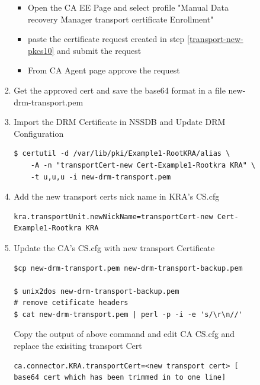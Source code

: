 \documentclass[a4paper]{article}
\begin{document}
\begin{enumerate}[label*=\arabic*.]
\begin{enumerate}[label*=\arabic*.]
\begin{enumerate}[label*=\arabic*.]
\begin{enumerate}[label*=\arabic*.]
                                    \begin{itemize}
                                        \item Open the CA EE Page and select profile "Manual Data recovery Manager transport certificate Enrollment"
                                        \item paste the certificate request created in step \ref{transport-new-pkcs10}  and submit the request
                                        \item From CA Agent page approve the request
                                    \end{itemize}
                                \item Get the approved cert  and save the base64 format in a file new-drm-transport.pem
                                \item Import the DRM Certificate in NSSDB and Update DRM Configuration
                                    \begin{lstlisting}[style=bashInputStyle]
$ certutil -d /var/lib/pki/Example1-RootKRA/alias \
    -A -n "transportCert-new Cert-Example1-Rootkra KRA" \
    -t u,u,u -i new-drm-transport.pem 
                                    \end{lstlisting}
                                \item Add the new transport certs nick name in KRA's CS.cfg
                                    \begin{lstlisting}
kra.transportUnit.newNickName=transportCert-new Cert-Example1-Rootkra KRA
                                    \end{lstlisting}
                                \item Update the CA's CS.cfg with new transport Certificate
                                    \begin{lstlisting}[style=bashInputStyle]
$cp new-drm-transport.pem new-drm-transport-backup.pem                                    

$ unix2dos new-drm-transport-backup.pem
# remove cetificate headers 
$ cat new-drm-transport.pem | perl -p -i -e 's/\r\n//'
                                    \end{lstlisting}
                                    
                                    Copy the output of above command and edit CA CS.cfg and replace the exisiting transport Cert

                                    \begin{lstlisting}
ca.connector.KRA.transportCert=<new transport cert> [ base64 cert which has been trimmed in to one line]                                    
                                    \end{lstlisting}


\end{enumerate}
\end{enumerate}
\end{enumerate}
\end{enumerate}
\end{document}

